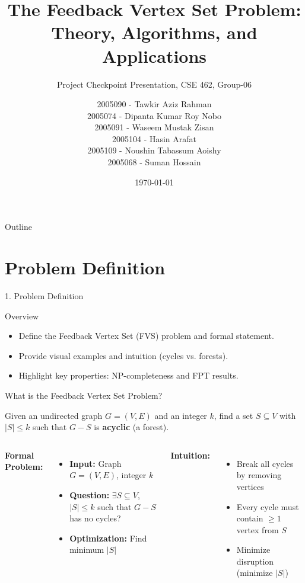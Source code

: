 \documentclass[aspectratio=169]{beamer}
\title[Feedback Vertex Set]{The Feedback Vertex Set Problem:\\Theory, Algorithms, and Applications}
\subtitle{Project Checkpoint Presentation, CSE 462, Group-06}
\author[Group-06 CSE462]{2005090 - Tawkir Aziz Rahman \\
		2005074 - Dipanta Kumar Roy Nobo \\
		2005091 - Waseem Mustak Zisan \\
		2005104 - Hasin Arafat \\
		2005109 - Noushin Tabassum Aoishy \\
		2005068 - Suman Hossain}
\institute[CSE,BUET]{Department of Computer Science and Engineering, Bangladesh University of Engineering and Technology}
\date{\today}
\newcommand{\fvs}{\textsc{FVS}}
\begin{document}
\begin{frame}
	\titlepage
\end{frame}

\begin{frame}{Outline}
	\tableofcontents
\end{frame}


\section{Problem Definition}

\begin{frame}{1. Problem Definition}
	\begin{block}{Overview}
		\begin{itemize}
			\item Define the Feedback Vertex Set (\fvs) problem and formal statement.
			\item Provide visual examples and intuition (cycles vs. forests).
			\item Highlight key properties: NP-completeness and FPT results.
		\end{itemize}
	\end{block}
\end{frame}

\begin{frame}{What is the Feedback Vertex Set Problem?}
	\begin{definition}
		Given an undirected graph $G = (V, E)$ and an integer $k$, find a set $S \subseteq V$ with $|S| \leq k$ such that $G - S$ is \textbf{acyclic} (a forest).
	\end{definition}

	\vspace{0.3cm}

	\begin{columns}[T]
		\textbf{Formal Problem:}
		\begin{itemize}
			\item \textbf{Input:} Graph $G = (V,E)$, integer $k$
			\item \textbf{Question:} $\exists S \subseteq V$, $|S| \leq k$ such that $G-S$ has no cycles?
			\item \textbf{Optimization:} Find minimum $|S|$
		\end{itemize}

		\textbf{Intuition:}
		\begin{itemize}
			\item Break all cycles by removing vertices
			\item Every cycle must contain $\geq 1$ vertex from $S$
			\item Minimize disruption (minimize $|S|$)
		\end{itemize}
	\end{columns}
\end{frame}
\end{document}
